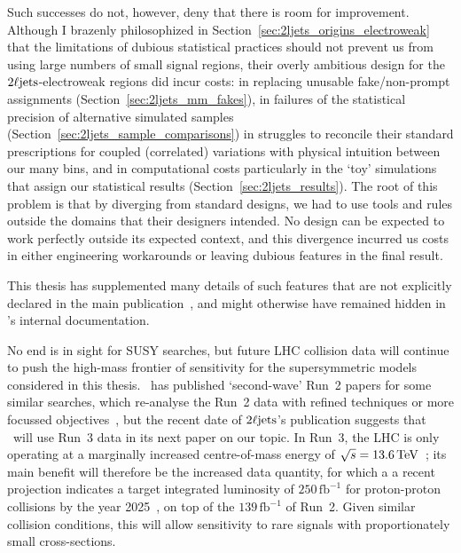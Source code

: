 Such successes do not, however, deny that there is room for improvement.
Although I brazenly philosophized in
Section~\ref{sec:2ljets_origins_electroweak} that the limitations of dubious
statistical practices should not prevent us from using large numbers of small
signal regions, their overly ambitious design for the $\twoljets$-electroweak
regions did incur costs:
in replacing unusable fake/non-prompt assignments
(Section~\ref{sec:2ljets_mm_fakes}),
in failures of the statistical precision of alternative simulated samples
(Section~\ref{sec:2ljets_sample_comparisons})
in struggles to reconcile their standard prescriptions for coupled
(correlated) variations with physical intuition between our many bins,
and in computational costs particularly in the `toy' simulations that assign
our statistical results (Section~\ref{sec:2ljets_results}).
The root of this problem is that by diverging from standard designs, we
had to use tools and rules outside the domains that their designers
intended.
No design can be expected to work perfectly outside its expected context,
and this divergence incurred us costs in either engineering workarounds or
leaving dubious features in the final result.

This thesis has supplemented many details of such features that are not
explicitly declared in the main publication~\cite{atlas2022searches},
and might otherwise have remained hidden in \atlas's internal documentation.

No end is in sight for SUSY searches, but future LHC collision data will
continue to push the high-mass frontier of sensitivity for the supersymmetric
models considered in this thesis.
\atlas\ has published `second-wave' Run~2 papers for some similar searches,
which re-analyse the Run~2 data with refined techniques or more focussed
objectives~\cite{ATLAS:2022hbt, ATLAS:2022nrb},
but the recent date of $\twoljets$'s publication suggests that \atlas\ will
use Run~3 data in its next paper on our topic.
In Run~3, the LHC is only operating at a marginally increased centre-of-mass energy
of $\sqrt{s} = 13.6\,\eV[T]$~\cite{run3sqrts};
its main benefit will therefore be the increased data quantity,
for which a a recent projection indicates a target integrated luminosity of
$250\,\mathrm{fb}^{-1}$ for proton-proton collisions by the year
2025~\cite{run3luminosity},
on top of the $139\,\mathrm{fb}^{-1}$ of Run~2.
Given similar collision conditions, this will allow sensitivity to rare signals
with proportionately small cross-sections.

